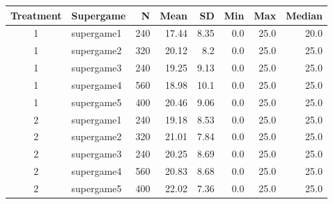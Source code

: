 \begin{tabular}{clrrrrrr}
  \toprule
  Treatment & Supergame & N & Mean & SD & Min & Max & Median \\ 
  \midrule
  1 & supergame1 & 240 & 17.44 & 8.35 & 0.0 & 25.0 & 20.0 \\ 
  1 & supergame2 & 320 & 20.12 & 8.2 & 0.0 & 25.0 & 25.0 \\ 
  1 & supergame3 & 240 & 19.25 & 9.13 & 0.0 & 25.0 & 25.0 \\ 
  1 & supergame4 & 560 & 18.98 & 10.1 & 0.0 & 25.0 & 25.0 \\ 
  1 & supergame5 & 400 & 20.46 & 9.06 & 0.0 & 25.0 & 25.0 \\ 
  2 & supergame1 & 240 & 19.18 & 8.53 & 0.0 & 25.0 & 25.0 \\ 
  2 & supergame2 & 320 & 21.01 & 7.84 & 0.0 & 25.0 & 25.0 \\ 
  2 & supergame3 & 240 & 20.25 & 8.69 & 0.0 & 25.0 & 25.0 \\ 
  2 & supergame4 & 560 & 20.83 & 8.68 & 0.0 & 25.0 & 25.0 \\ 
  2 & supergame5 & 400 & 22.02 & 7.36 & 0.0 & 25.0 & 25.0 \\ 
  \bottomrule
\end{tabular}
